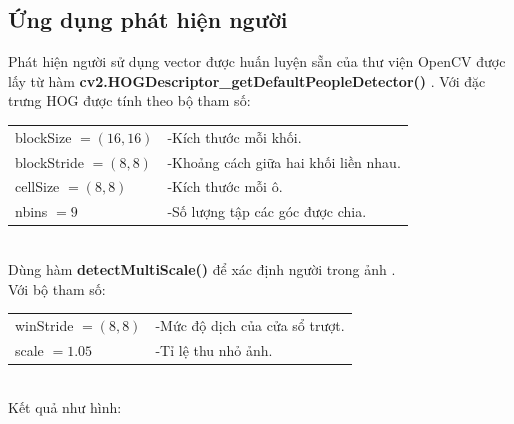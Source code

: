 \documentclass[../report.tex]{subfiles}
\begin{document}
\subsection{Ứng dụng phát hiện người}
Phát hiện người sử dụng vector được huấn luyện 
sẵn của thư viện OpenCV được lấy từ hàm 
\textbf{cv2.HOGDescriptor\_getDefaultPeopleDetector()} 
\cite{human-detection-opencv}.
Với đặc trưng HOG được tính theo bộ tham số: \\[3mm]
\begin{tabular}{|l l|}
\hline
blockSize $= (16, 16)$  &-Kích thước mỗi khối. \\
blockStride $= (8, 8)$  &-Khoảng cách giữa hai khối liền nhau.  \\
cellSize $= (8, 8)$     &-Kích thước mỗi ô. \\
nbins $= 9$             &-Số lượng tập các góc được chia. \\
\hline
\end{tabular} \\[3mm]
Dùng hàm \textbf{detectMultiScale()} 
để xác định người trong ảnh \cite{detectmultiscale-params}. \\
Với bộ tham số: \\[3mm]
\begin{tabular}{|l l|}
\hline
winStride $= (8, 8)$    &-Mức độ dịch của cửa sổ trượt. \\
scale $= 1.05$          &-Tỉ lệ thu nhỏ ảnh. \\
\hline
\end{tabular} \\[5mm]
Kết quả như hình: 
\end{document}
